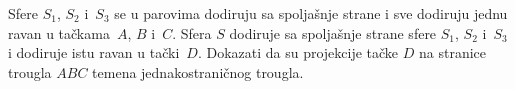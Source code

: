 \problem{}
Sfere $S_1$, $S_2$ i~$S_3$ se u parovima dodiruju sa spoljašnje strane i sve dodiruju jednu ravan u tačkama~$A$, $B$ i~$C$.
Sfera $S$ dodiruje sa spoljašnje strane sfere $S_1$, $S_2$ i~$S_3$ i dodiruje istu ravan u tački~$D$.
Dokazati da su projekcije tačke $D$ na stranice trougla $ABC$ temena jednakostraničnog trougla. 
\solution
\endproblem
